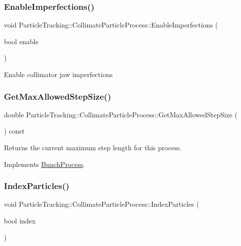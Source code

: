 \subsubsection{\texorpdfstring{Enable\+Imperfections()}{EnableImperfections()}}
{\footnotesize\ttfamily void Particle\+Tracking\+::\+Collimate\+Particle\+Process\+::\+Enable\+Imperfections (\begin{DoxyParamCaption}\item[{bool}]{enable }\end{DoxyParamCaption})}

Enable collimator jaw imperfections \mbox{\label{classParticleTracking_1_1CollimateParticleProcess_a26262dec26f0c35658a2a968a1583b81}} 
\subsubsection{\texorpdfstring{Get\+Max\+Allowed\+Step\+Size()}{GetMaxAllowedStepSize()}}
{\footnotesize\ttfamily double Particle\+Tracking\+::\+Collimate\+Particle\+Process\+::\+Get\+Max\+Allowed\+Step\+Size (\begin{DoxyParamCaption}{ }\end{DoxyParamCaption}) const\hspace{0.3cm}{\ttfamily [virtual]}}

Returns the current maximum step length for this process. 

Implements \hyperlink{classBunchProcess}{Bunch\+Process}.

\mbox{\label{classParticleTracking_1_1CollimateParticleProcess_ab6d43f1bec63763099ef71a003ceaef4}} 
\subsubsection{\texorpdfstring{Index\+Particles()}{IndexParticles()}}
{\footnotesize\ttfamily void Particle\+Tracking\+::\+Collimate\+Particle\+Process\+::\+Index\+Particles (\begin{DoxyParamCaption}\item[{bool}]{index }\end{DoxyParamCaption})}

